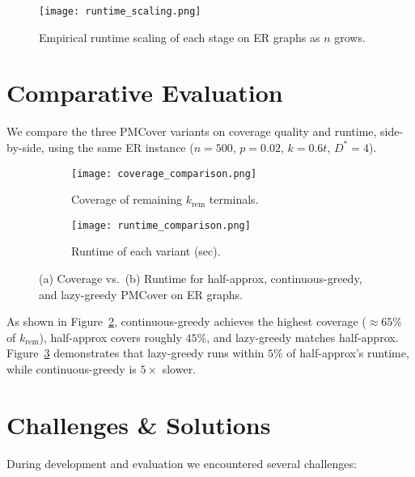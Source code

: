 \documentclass[12pt]{article}
\begin{document}
\begin{figure}[!b]
  \centering
  \texttt{[image: runtime\_scaling.png]}
  \caption{Empirical runtime scaling of each stage on ER graphs as \(n\) grows.}
  \label{fig:runtime-scaling}
\end{figure}
\section{Comparative Evaluation}
\label{sec:compare}

We compare the three PMCover variants on coverage quality and runtime, side-by-side, using the same ER instance (\(n=500\), \(p=0.02\), \(k=0.6t\), \(D^*=4\)).

\begin{figure}[H]
  \centering
  \begin{subfigure}[b]{0.48\textwidth}
    \centering
    \texttt{[image: coverage\_comparison.png]}
    \caption{Coverage of remaining \(k_{\mathrm{rem}}\) terminals.}
    \label{fig:cov-compare}
  \end{subfigure}
  \hfill
  \begin{subfigure}[b]{0.48\textwidth}
    \centering
    \texttt{[image: runtime\_comparison.png]}
    \caption{Runtime of each variant (sec).}
    \label{fig:rt-compare}
  \end{subfigure}
  \caption{(a) Coverage vs.\ (b) Runtime for half-approx, continuous-greedy, and lazy-greedy PMCover on ER graphs.}
  \label{fig:compare-both}
\end{figure}

As shown in Figure~\ref{fig:cov-compare}, continuous-greedy achieves the highest coverage (\(\approx65\%\) of \(k_{\mathrm{rem}}\)), half-approx covers roughly \(45\%\), and lazy-greedy matches half-approx.  Figure~\ref{fig:rt-compare} demonstrates that lazy-greedy runs within \(5\%\) of half-approx’s runtime, while continuous-greedy is \(5\times\) slower.

\section{Challenges \& Solutions}
\label{sec:challenges}

During development and evaluation we encountered several challenges:
\end{document}
